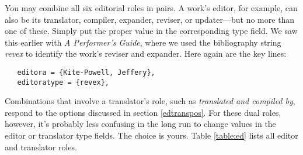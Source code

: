 \documentclass[11pt,letterpaper,oneside]{article}
\begin{document}
\begin{citebib}
\item \cite{schechter2011}
\item \cite{turabian2013}
\end{citebib}

You may combine all six editorial roles in pairs. A work's editor, for
example, can also be its translator, compiler, expander, reviser, or
updater---but no more than one of these. Simply put the proper value
in the corresponding type field. We saw this earlier with \textit{A
Performer's Guide}, where we used the bibliography string
\textit{revex} to identify the work's reviser and expander. Here again
are the key lines:

\begin{verbatim}
   editora = {Kite-Powell, Jeffery},
   editoratype = {revex},
\end{verbatim}

\noindent Combinations that involve a translator's role, such as
\textit{translated and compiled by}, respond to the 
options discussed in section \ref{edtranspos}. For these dual roles,
however, it's probably less confusing in the long run to change values
in the editor or translator type fields. The choice is yours. Table
\ref{table:ed} lists all editor and translator roles.
\end{document}
